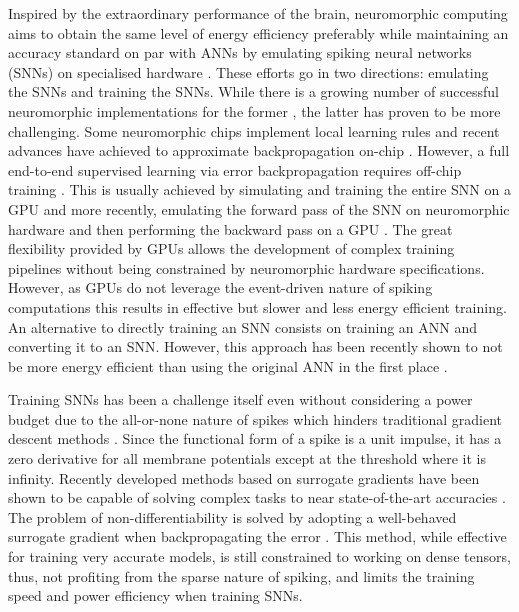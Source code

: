 \documentclass{article}
\begin{document}
Inspired by the extraordinary performance of the brain, neuromorphic computing aims to obtain the same level of energy efficiency preferably while maintaining an accuracy standard on par with ANNs by emulating spiking neural networks (SNNs) on specialised hardware \cite{pfeil2013six, merolla2014million, esser2016convolutional, diehl2016conversion}. These efforts go in two directions: emulating the SNNs and training the SNNs. While there is a growing number of successful neuromorphic implementations for the former \cite{mahowald1991silicon, schemmel2010wafer, merolla2011digital, moradi2013event, chicca2014neuromorphic, merolla2014million, benjamin2014neurogrid, davies2018loihi}, the latter has proven to be more challenging. Some neuromorphic chips implement local learning rules \cite{davies2018loihi, pedretti2017memristive, kim2018demonstration} and recent advances have achieved to approximate backpropagation on-chip \cite{kwon2020chip}. However, a full end-to-end supervised learning via error backpropagation requires off-chip training \cite{merolla2011digital, moradi2013event, esser2016convolutional}. This is usually achieved by simulating and training the entire SNN on a GPU and more recently, emulating the forward pass of the SNN on neuromorphic hardware and then performing the backward pass on a GPU \cite{schmitt2017neuromorphic, cramer2020training}. The great flexibility provided by GPUs allows the development of complex training pipelines without being constrained by neuromorphic hardware specifications. However, as GPUs do not leverage the event-driven nature of spiking computations this results in effective but slower and less energy efficient training. An alternative to directly training an SNN consists on training an ANN and converting it to an SNN. However, this approach has been recently shown to not be more energy efficient than using the original ANN in the first place \cite{davidson2021comparison}.

Training SNNs has been a challenge itself even without considering a power budget due to the all-or-none nature of spikes which hinders traditional gradient descent methods \cite{SuGD_zenke, wunderlich2021event}. Since the functional form of a spike is a unit impulse, it has a zero derivative for all membrane potentials except at the threshold where it is infinity. Recently developed methods based on surrogate gradients have been shown to be capable of solving complex tasks to near state-of-the-art accuracies \cite{hunsberger2015spiking, esser2016convolutional, Shresta2018SLAYER, wozniak2020deep, zenke2021remarkable, perez2021neural, cramer2020training}. The problem of non-differentiability is solved by adopting a well-behaved surrogate gradient when backpropagating the error \cite{SuGD_zenke}. This method, while effective for training very accurate models, is still constrained to working on dense tensors, thus, not profiting from the sparse nature of spiking, and limits the training speed and power efficiency when training SNNs.
\end{document}
